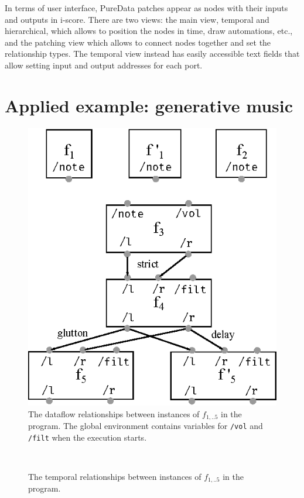 \documentclass{article}
\begin{document}
In terms of user interface, PureData patches appear as nodes with their inputs and outputs in i-score.
There are two views: the main view, temporal and hierarchical, which allows to position the nodes in time, draw automations, etc., and the patching view which allows to connect nodes together and set the relationship types.
The temporal view instead has easily accessible text fields that allow setting input and output addresses for each port.

\section{Applied example: generative music}
\begin{figure}
    \centering
    \includegraphics[scale=0.7]{images/nodes.eps}
    
    \caption{The dataflow relationships between instances of $f_{1,..5}$ in the program. The global environment contains variables for \lstinline|/vol| and \lstinline|/filt| when the execution starts.}
    \label{fig.datapatch}
\end{figure}~
\begin{figure}
    \centering
    \begin{tikzpicture}
    
    \end{tikzpicture}
    \caption{The temporal relationships between instances of $f_{1,..5}$ in the program.}
    \label{fig.timepatch}
\end{figure}
\end{document}
